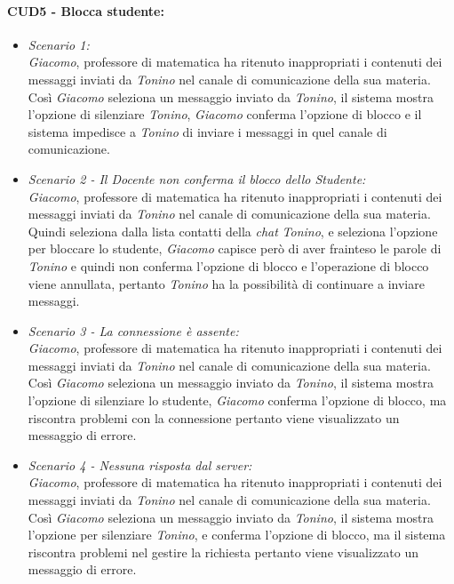 \paragraph{CUD5 - Blocca studente:\\}
\begin{itemize}
	\item \textit{Scenario 1:\\}
	\textit{Giacomo}, professore di matematica ha ritenuto inappropriati i contenuti dei messaggi inviati da \textit{Tonino} nel canale di comunicazione della sua materia. Così \textit{Giacomo} seleziona un messaggio inviato da \textit{Tonino}, il sistema mostra l’opzione di silenziare \textit{Tonino}, \textit{Giacomo} conferma l’opzione di blocco e il sistema impedisce a \textit{Tonino} di inviare i messaggi in quel canale di comunicazione.\\
	
	\item \textit{Scenario 2 - Il \textit{Docente} non conferma il blocco dello \textit{Studente}:\\}
	\textit{Giacomo}, professore di matematica ha ritenuto inappropriati i contenuti dei messaggi inviati da \textit{Tonino} nel canale di comunicazione della sua materia. Quindi seleziona dalla lista contatti della \textit{chat} \textit{Tonino}, e seleziona l’opzione per bloccare lo studente, \textit{Giacomo} capisce però di aver frainteso le parole di \textit{Tonino} e quindi non conferma l’opzione di blocco e l’operazione di blocco viene annullata, pertanto \textit{Tonino} ha la possibilità di continuare a inviare messaggi.\\
	
	\item \textit{Scenario 3 - La connessione è assente:\\}
	\textit{Giacomo}, professore di matematica ha ritenuto inappropriati i contenuti dei messaggi inviati da \textit{Tonino} nel canale di comunicazione della sua materia. Così \textit{Giacomo} seleziona un messaggio inviato da \textit{Tonino}, il sistema mostra l’opzione di silenziare  lo studente, \textit{Giacomo} conferma l’opzione di blocco, ma riscontra problemi con la connessione pertanto viene visualizzato un messaggio di errore.\\
	
	\item \textit{Scenario 4 - Nessuna risposta dal server:\\}
	\textit{Giacomo}, professore di matematica ha ritenuto inappropriati i contenuti dei messaggi inviati da \textit{Tonino} nel canale di comunicazione della sua materia. Così \textit{Giacomo} seleziona un messaggio inviato da \textit{Tonino}, il sistema mostra l’opzione per silenziare \textit{Tonino}, e conferma l’opzione di blocco, ma il sistema riscontra problemi nel gestire la richiesta pertanto viene visualizzato un messaggio di errore.\\
\end{itemize}

